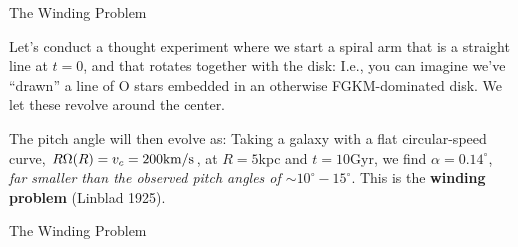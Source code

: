 \documentclass[letterpaper,landscape]{slides}
\begin{document}
\begin{slide}
\begin{center}
{\large \color{red} 
                 The Winding Problem }
\end{center}

Let's conduct a thought experiment where we start a spiral arm that is a
straight line at $t = 0$, and that rotates together with the disk:
I.e., you can imagine we've ``drawn'' a line of O stars embedded in an otherwise
FGKM-dominated disk. We let these revolve around the center.

The pitch angle will then evolve as:
Taking a galaxy with a flat circular-speed curve, $R\Omega(R) = v_c = 200 {\rm km/s}$,
at $R = 5$kpc and $t = 10$Gyr, we find $\alpha = 0.14^\circ$, {\em far smaller
than the observed pitch angles of $\sim 10^\circ-15^\circ$}. This is the {\bf
winding problem} (Linblad 1925).

\vfill
\end{slide}

\begin{slide}

\begin{center}
{\large \color{red} 
                 The Winding Problem }
\end{center}

\begin{center}
\vskip -0.0in
\end{center}

\vfill
\end{slide}
\end{document}
